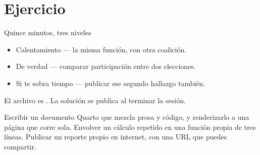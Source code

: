 \section{Ejercicio}

\begin{frame}{Quince minutos, tres niveles}
  \vspace{0.4em}
  \begin{itemize}\setlength{\itemsep}{1.0em}
    \item \ac{Calentamiento} — la misma función, con otra coalición.
    \item \ac{De verdad} — comparar participación entre dos elecciones.
    \item \ac{Si te sobra tiempo} — publicar ese segundo hallazgo también.
  \end{itemize}

  \vspace{1.2em}
  {\small\color{grisTenue}El archivo es . La solución
  se publica al terminar la sesión.}
\end{frame}

\yasabemos
  {Escribir un documento Quarto que mezcla prosa y código, y renderizarlo a una página que corre sola.}
  {Envolver un cálculo repetido en una función propia de tres líneas.}
  {Publicar un reporte propio en internet, con una URL que puedes compartir.}




